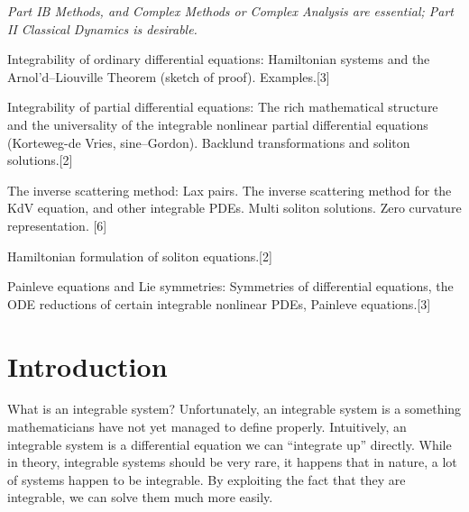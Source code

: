 \documentclass[a4paper]{article}
\begin{document}
\maketitle
{\small
\noindent\emph{Part IB Methods, and Complex Methods or Complex Analysis are essential; Part II Classical Dynamics is desirable.}

\vspace{10pt}
\noindent Integrability of ordinary differential equations: Hamiltonian systems and the Arnol'd--Liouville Theorem (sketch of proof). Examples.\hspace*{\fill}[3]

\vspace{5pt}
\noindent Integrability of partial differential equations: The rich mathematical structure and the universality of the integrable nonlinear partial differential equations (Korteweg-de Vries, sine--Gordon). Backlund transformations and soliton solutions.\hspace*{\fill}[2]

\vspace{5pt}
\noindent The inverse scattering method: Lax pairs. The inverse scattering method for the KdV equation, and other integrable PDEs. Multi soliton solutions. Zero curvature representation. \hspace*{\fill}[6]

\vspace{5pt}
\noindent Hamiltonian formulation of soliton equations.\hspace*{\fill}[2]

\vspace{5pt}
\noindent Painleve equations and Lie symmetries: Symmetries of differential equations, the ODE reductions of certain integrable nonlinear PDEs, Painleve equations.\hspace*{\fill}[3]%
}

\tableofcontents
\setcounter{section}{-1}
\section{Introduction}
What is an integrable system? Unfortunately, an integrable system is a something mathematicians have not yet managed to define properly. Intuitively, an integrable system is a differential equation we can ``integrate up'' directly. While in theory, integrable systems should be very rare, it happens that in nature, a lot of systems happen to be integrable. By exploiting the fact that they are integrable, we can solve them much more easily.
\end{document}
